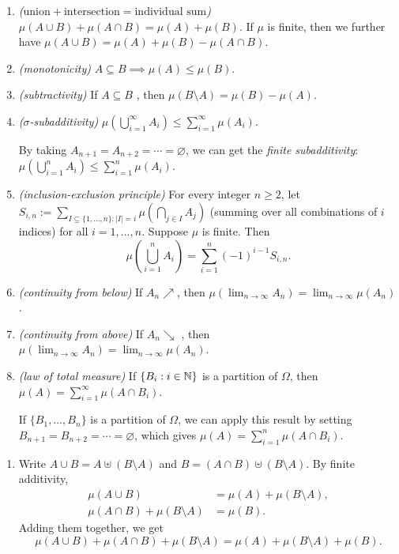 \begin{enumerate}
\begin{enumerate}
\item \label{it:union-plus-int} \emph{(\(\text{union}+\text{intersection}=\text{individual sum}\))}
\(\mu(A\cup B)+\mu(A\cap B)=\mu(A)+\mu(B)\). If \(\mu\) is finite, then
we further have \(\mu(A\cup B)=\mu(A)+\mu(B)-\mu(A\cap B)\).
\item \emph{(monotonicity)} \(A\subseteq B\implies \mu(A)\le\mu(B)\).
\item \emph{(subtractivity)} If \(A\subseteq B\) ,
then \(\mu(B\setminus A)=\mu(B)-\mu(A)\).
\item \emph{(\(\sigma\)-subadditivity)}
\(\mu(\bigcup_{i=1}^{\infty}A_i)\le\sum_{i=1}^{\infty}\mu(A_i)\).
\begin{note}
By taking \(A_{n+1}=A_{n+2}=\dotsb=\varnothing\), we can get the
\emph{finite subadditivity}: \(\mu(\bigcup_{i=1}^{n}A_i)\le\sum_{i=1}^{n}\mu(A_i)\).
\end{note}
\item \emph{(inclusion-exclusion principle)} For every integer \(n\ge 2\), let
\(S_{i,n}:=\sum_{I\subseteq \{1,\dotsc,n\}: |I|=i}^{}\mu(\bigcap_{j\in
I}^{}A_j)\) (summing over all combinations of \(i\) indices) for all
\(i=1,\dotsc,n\). Suppose \(\mu\) is finite. Then
\[
\mu\left(\bigcup_{i=1}^{n}A_i\right)
=\sum_{i=1}^{n}(-1)^{i-1}S_{i,n}.
\]
\item \emph{(continuity from below)} If \(A_n\nearrow\), then
\(\mu(\lim_{n\to\infty}A_n)=\lim_{n\to\infty}\mu(A_n)\).
\item \emph{(continuity from above)} If \(A_n\searrow\) , then
\(\mu(\lim_{n\to\infty}A_n)=\lim_{n\to\infty}\mu(A_n)\).
\item \emph{(law of total measure)} If \(\{B_{i}:i\in\mathbb{N}\}\) is a partition of
\(\Omega\), then \(\mu(A)=\sum_{i=1}^{\infty}\mu(A\cap B_i)\).
\begin{note}
If \(\{B_1,\dotsc,B_n\}\) is a partition of \(\Omega\), we can apply this
result by setting \(B_{n+1}=B_{n+2}=\dotsb=\varnothing\), which gives
\(\mu(A)=\sum_{i=1}^{n}\mu(A\cap B_i)\).
\end{note}
\end{enumerate}
\begin{pf}
\begin{enumerate}
\item Write \(A\cup B=A\uplus (B\setminus A)\) and \(B=(A\cap
B)\uplus (B\setminus A)\). By finite additivity,
\begin{align}
\label{eq:mu-acupb}\mu(A\cup B)&=\mu(A)+\mu(B\setminus A), \\
\label{eq:mu-b}\mu(A\cap B)+\mu(B\setminus A)&=\mu(B).
\end{align}
Adding them together, we get
\begin{equation}
\label{eq:three-term-eq}
\mu(A\cup B)+\mu(A\cap B)+\mu(B\setminus A)
=\mu(A)+\mu(B\setminus A)+\mu(B).
\end{equation}


\end{enumerate}
\end{pf}
\end{enumerate}
